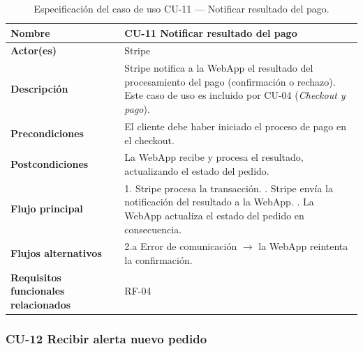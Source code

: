 \begin{table}[H]
\centering
\small
\begin{tabular}{|m{}|m{}|}
\hline
\textbf{Nombre} & CU-11 Notificar resultado del pago \\ \hline
\textbf{Actor(es)} & Stripe \\ \hline
\textbf{Descripción} & Stripe notifica a la WebApp el resultado del procesamiento del pago (confirmación o rechazo). Este caso de uso es incluido por CU-04 (\textit{Checkout y pago}). \\ \hline
\textbf{Precondiciones} & El cliente debe haber iniciado el proceso de pago en el checkout. \\ \hline
\textbf{Postcondiciones} & La WebApp recibe y procesa el resultado, actualizando el estado del pedido. \\ \hline
\textbf{Flujo principal} & 1. Stripe procesa la transacción. \newline 2. Stripe envía la notificación del resultado a la WebApp. \newline 3. La WebApp actualiza el estado del pedido en consecuencia. \\ \hline
\textbf{Flujos alternativos} & 2.a Error de comunicación $\rightarrow$ la WebApp reintenta la confirmación. \\ \hline
\textbf{Requisitos funcionales relacionados} & RF-04 \\ \hline
\end{tabular}
\caption{Especificación del caso de uso CU-11 — Notificar resultado del pago.}
\end{table}

\clearpage

\subsubsection{CU-12 Recibir alerta nuevo pedido}

